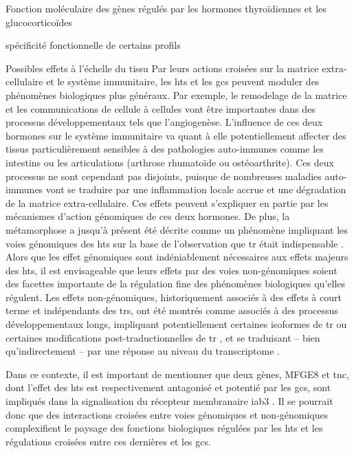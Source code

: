 \documentclass[../main.tex]{subfiles}
\begin{document}
\begin{chapter}{Fonction moléculaire des gènes régulés par les hormones thyroïdiennes et les glucocorticoïdes}
\begin{section}{spécificité fonctionnelle de certains profils}
\begin{subsection}{Possibles effets à l’échelle du tissu}
Par leurs actions croisées sur la matrice extra-cellulaire et le système immunitaire, les \glspl{ht} et les \glspl{gc} peuvent moduler des phénomènes biologiques plus généraux.
Par exemple, le remodelage de la matrice et les communications de cellule à cellules vont être importantes dans des processus développementaux tels que l'angiogenèse.
L'influence de ces deux hormones sur le système immunitaire va quant à elle potentiellement affecter des tissus particulièrement sensibles à des pathologies auto-immunes comme les intestins ou les articulations (arthrose rhumatoïde ou ostéoarthrite).
Ces deux processus ne sont cependant pas disjoints, puisque de nombreuses maladies auto-immunes vont se traduire par une inflammation locale accrue et une dégradation de la matrice extra-cellulaire.
Ces effets peuvent s'expliquer en partie par les mécanismes d'action génomiques de ces deux hormones.
De plus, la métamorphose a jusqu'à présent été décrite comme un phénomène impliquant les voies génomiques des \glspl{ht} sur la base de l'observation que \gls{tr} était indispensable \citep{Das2010}.
Alors que les effet génomiques sont indéniablement nécessaires aux effets majeurs des \glspl{ht}, il est envisageable que leurs effets par des voies non-génomiques soient des facettes importante de la régulation fine des phénomènes biologiques qu'elles régulent. 
Les effets non-génomiques, historiquement associés à des effets à court terme et indépendants des \glspl{tr}, ont été montrés comme associés à des processus développementaux longs, impliquant potentiellement certaines isoformes de \gls{tr} ou certaines modifications post-traductionnelles de \gls{tr} \citep{Davis2005}, et se traduisant – bien qu'indirectement – par une réponse au niveau du transcriptome \citep{Davis2011}.
\par
Dans ce contexte, il est important de mentionner que deux gènes, MFGE8 et \gls{tnc}, dont l'effet des \glspl{ht} est respectivement antagonisé et potentié par les \glspl{gc}, sont impliqués dans la signalisation du récepteur membranaire \gls{iab3} \citep{Sriramarao1993,Aziz2009}.
Il se pourrait donc que des interactions croisées entre voies génomiques et non-génomiques complexifient le paysage des fonctions biologiques régulées par les \glspl{ht} et les régulations croisées entre ces dernières et les \glspl{gc}.
\end{subsection}

\end{section}

\end{chapter}
\end{document}
